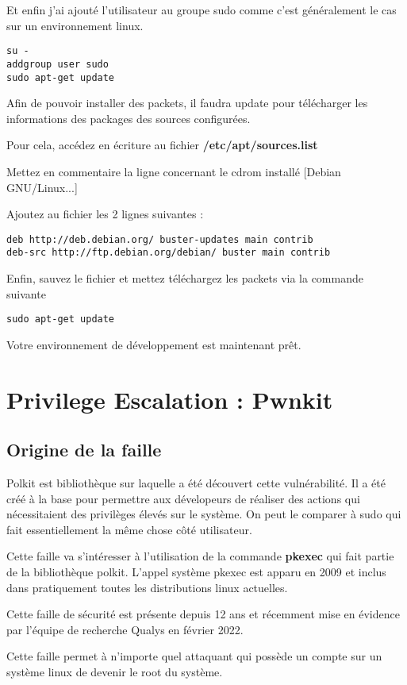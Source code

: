 \documentclass[a4paper, 12pt]{article}
\begin{document}
\begin{flushleft}
       \item Et enfin j'ai ajouté l'utilisateur au groupe sudo comme c'est généralement le cas sur un environnement linux.
       \begin{lstlisting}
su -
addgroup user sudo
sudo apt-get update
       \end{lstlisting}
       \item Afin de pouvoir installer des packets, il faudra update pour télécharger les informations des packages des sources configurées.
       \item Pour cela, accédez en écriture au fichier \textbf{/etc/apt/sources.list}
       \item Mettez en commentaire la ligne concernant le cdrom installé [Debian GNU/Linux...]
       \item Ajoutez au fichier les 2 lignes suivantes : 
       \begin{lstlisting}
deb http://deb.debian.org/ buster-updates main contrib
deb-src http://ftp.debian.org/debian/ buster main contrib
       \end{lstlisting}
    \item Enfin, sauvez le fichier et mettez téléchargez les packets via la commande suivante
    \begin{lstlisting}
sudo apt-get update
    \end{lstlisting}
    \item Votre environnement de développement est maintenant prêt.
   \end{flushleft}

   \section{Privilege Escalation : Pwnkit}   		
		\subsection{Origine de la faille}   
   		\begin{flushleft}
			\noindent 	Polkit est bibliothèque sur laquelle a été découvert cette vulnérabilité. Il a été créé à la base pour permettre aux dévelopeurs de réaliser des actions qui nécessitaient des privilèges élevés sur le système. On peut le comparer à sudo qui fait essentiellement la même chose côté utilisateur.
   			\item Cette faille va s'intéresser à l'utilisation de la commande \textbf{pkexec} qui fait partie de la bibliothèque polkit. L'appel système pkexec est apparu en 2009 et inclus dans pratiquement toutes les distributions linux actuelles.
   			\item Cette faille de sécurité est présente depuis 12 ans et récemment mise en évidence par l'équipe de recherche Qualys en février 2022. \cite{qualys}
   			\item Cette faille permet à n’importe quel attaquant qui possède un compte sur un système linux de devenir le root du système.
   		\end{flushleft}
\end{document}
